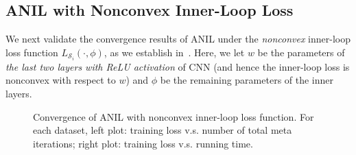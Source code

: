 \documentclass{osudissert96}
\begin{document}

\subsection*{ANIL with Nonconvex Inner-Loop Loss}

We next validate the convergence results of ANIL under the {\em nonconvex} inner-loop loss function $L_{\mathcal{S}_i}(\cdot,\phi)$, as we establish in~. 
Here, we let $w$ be the parameters of {\em the last two layers with ReLU activation} of CNN (and hence the inner-loop loss is nonconvex with respect to $w$) and $\phi$ be the remaining parameters of the inner layers. 

  \begin{figure*}[h]
	\centering    
	\caption{Convergence of ANIL with nonconvex inner-loop loss function.  For each dataset, left plot: training loss v.s. number of total meta iterations; right plot: training loss v.s. running time.}\label{figure:resultxiarenbaba}
\end{figure*}
\end{document}

